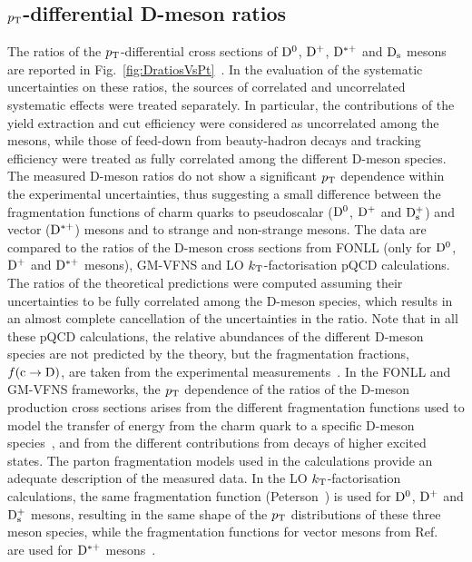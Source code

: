\subsection{$p_{\rm T}$-differential D-meson ratios}
\label{sec:ppDratios}
The ratios of the $p_{\rm T}$-differential cross sections of ${\rm D^0}$, ${\rm D^+}$, 
${\rm D^{*+}}$ and ${\rm D_s}$ mesons are reported in Fig.~\ref{fig:DratiosVsPt}~\cite{Acharya:2017jgo}.
In the evaluation of the systematic uncertainties on these ratios, 
the sources of correlated and uncorrelated systematic effects were treated 
separately. In particular, the contributions of the yield extraction and cut efficiency 
were considered as uncorrelated among the mesons, while those of feed-down from 
beauty-hadron decays and tracking efficiency were treated as fully 
correlated among the different D-meson species.
The measured D-meson ratios do not show a significant $p_{\rm T}$ dependence within 
the experimental uncertainties, thus suggesting a small difference 
between the fragmentation functions of charm quarks to pseudoscalar 
(${\rm D^0}$, ${\rm D^+}$ and ${\rm D_s^+}$) and vector (${\rm D^{*+}}$) mesons and to strange and 
non-strange mesons.
The data are compared to the ratios of the D-meson cross sections from FONLL 
(only for ${\rm D^0}$, ${\rm D^+}$ and ${\rm D^{*+}}$ mesons), GM-VFNS and LO 
$k_{\rm T}$-factorisation pQCD calculations.
The ratios of the theoretical predictions were computed assuming their 
uncertainties to be fully correlated among the D-meson species, which 
results in an almost complete cancellation of the uncertainties in the ratio. 
Note that in all these pQCD calculations, the relative abundances of the 
different D-meson species are not predicted by the theory, but 
the fragmentation fractions, $f({\rm c\rightarrow D})$, are taken from 
the experimental measurements~\cite{Kneesch:2007ey,Cacciari:2012ny,Cacciari:2003zu,Maciula:2013wg,Barate:1999bg,Gladilin:2014tba}.
In the FONLL and GM-VFNS frameworks, the $p_{\rm T}$ dependence 
of the ratios of the D-meson production cross sections arises from the 
different fragmentation functions used to model the transfer of energy from 
the charm quark to a specific D-meson 
species~\cite{Cacciari:2003zu,Kneesch:2007ey,Kniehl:2006mw}, 
and from the different contributions from decays of higher excited states.
The parton fragmentation models used in the calculations provide
an adequate description of the measured data.
In the LO $k_{\rm T}$-factorisation calculations, the same fragmentation function 
(Peterson~\cite{Peterson:1982ak}) is used for ${\rm D^0}$, ${\rm D^+}$ and ${\rm D_s^+}$ 
mesons, resulting in the same shape of the $p_{\rm T}$ distributions of these three 
meson species, while 
the fragmentation functions for vector mesons from Ref.~\cite{Braaten:1994bz} 
are used for ${\rm D^{*+}}$ mesons~\cite{Maciula:2013wg}.

